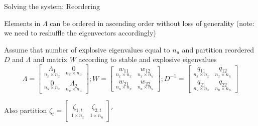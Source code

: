 \documentclass[handout,usepdftitle=false,xcolor=dvipsnames,aspectratio=169]{beamer}
\begin{document}
\begin{frame}{Solving the system: Reordering}
\begin{witemize}
\item Elements in $\Lambda$ can be ordered in ascending order without loss of generality (note: we need to reshuffle the eigenvectors accordingly)
\item Assume that number of explosive eigenvalues equal to $n_u$ and partition reordered $D$ and $\Lambda$ and matrix $W$ according to stable and explosive eigenvalues
\footnotesize{
\[ \Lambda = \left[\begin{array}{cc}
               \underset{n_x\times n_x}{\Lambda_1} & \underset{n_x \times n_u}{0} \\
               \underset{n_u\times n_x}{0} & \underset{ n_u \times n_u}{\Lambda_2}
             \end{array} \right]; W=  \left[\begin{array}{cc}
               \underset{n_x\times n_x}{w_{11}} & \underset{n_x\times n_u}{w_{12}} \\
               \underset{n_u\times n_x}{w_{21}} & \underset{n_u\times n_u}{w_{22}}
             \end{array} \right]; D^{-1}=  \left[\begin{array}{cc}
               \underset{n_x\times n_x}{q_{11}} & \underset{n_x\times n_u}{q_{12}} \\
               \underset{n_u\times n_x}{q_{21}} & \underset{n_u\times n_u}{q_{22}}
             \end{array} \right] \]}
\item Also partition $\zeta_t=\left[\begin{array}{cc}
                         \underset{1 \times n_x}{\zeta_{1,t}} & \underset{1 \times n_u}{\zeta_{2,t}}
                       \end{array}
 \right]'$
\end{witemize}
\end{frame}
\end{document}
